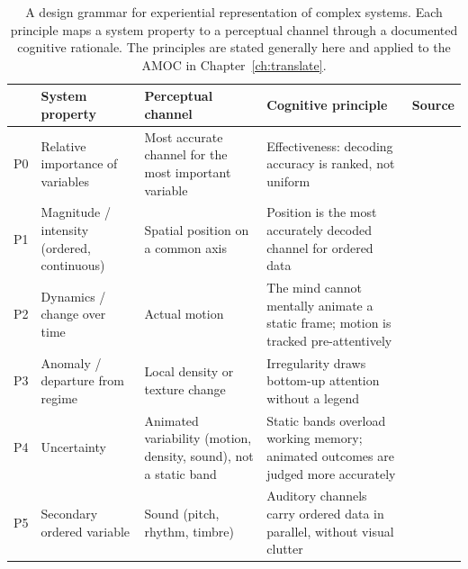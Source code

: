 \begin{table}[!ht]
    \centering
    \small
    \caption{A design grammar for experiential representation of complex systems.
             Each principle maps a system property to a perceptual channel through
             a documented cognitive rationale. The principles are stated generally
             here and applied to the AMOC in Chapter~\ref{ch:translate}.}
    \label{tab:design-grammar}
    \begin{tabular}{@{}p{0.5cm}p{2.5cm}p{2.9cm}p{3.3cm}p{2.3cm}@{}}
        \toprule
        & \textbf{System property} & \textbf{Perceptual channel} & \textbf{Cognitive principle} & \textbf{Source} \\
        \midrule
        P0 & Relative importance of variables
           & Most accurate channel for the most important variable
           & Effectiveness: decoding accuracy is ranked, not uniform
           & \citet{bertin1983, clevelandmcgill1984, munzner2014} \\[0.4em]
        P1 & Magnitude / intensity (ordered, continuous)
           & Spatial position on a common axis
           & Position is the most accurately decoded channel for ordered data
           & \citet{clevelandmcgill1984, tversky2019} \\[0.4em]
        P2 & Dynamics / change over time
           & Actual motion
           & The mind cannot mentally animate a static frame; motion is tracked pre-attentively
           & \citet{sterman2008, cronin2009, ware2021} \\[0.4em]
        P3 & Anomaly / departure from regime
           & Local density or texture change
           & Irregularity draws bottom-up attention without a legend
           & \citet{bertin1983, ware2021} \\[0.4em]
        P4 & Uncertainty
           & Animated variability (motion, density, sound), not a static band
           & Static bands overload working memory; animated outcomes are judged more accurately
           & \citet{padilla2018, hullman2015hops, kale2019hops} \\[0.4em]
        P5 & Secondary ordered variable
           & Sound (pitch, rhythm, timbre)
           & Auditory channels carry ordered data in parallel, without visual clutter
           & \citet{hermann2011} \\
        \bottomrule
    \end{tabular}
\end{table}

